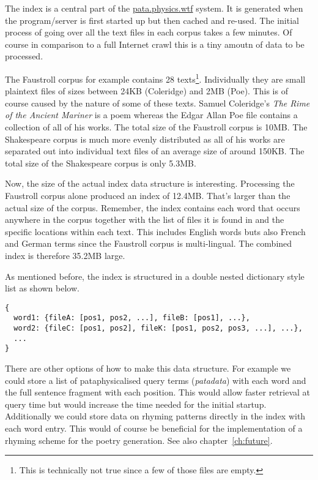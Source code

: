 
The index is a central part of the \url{pata.physics.wtf} system. It is generated when the program/server is first started up but then cached and re-used. The initial process of going over all the text files in each corpus takes a few minutes. Of course in comparison to a full Internet crawl this is a tiny amoutn of data to be processed. 

The Faustroll corpus for example contains 28 texts\footnote{This is technically not true since a few of those files are empty.}. Individually they are small plaintext files of sizes between 24KB (Coleridge) and 2MB (Poe). This is of course caused by the nature of some of these texts. Samuel Coleridge's \textit{The Rime of the Ancient Mariner} is a poem whereas the Edgar Allan Poe file contains a collection of all of his works. The total size of the Faustroll corpus is 10MB. The Shakespeare corpus is much more evenly distributed as all of his works are separated out into individual text files of an average size of around 150KB. The total size of the Shakespeare corpus is only 5.3MB.

Now, the size of the actual index data structure is interesting. Processing the Faustroll corpus alone produced an index of 12.4MB. That's larger than the actual size of the corpus. Remember, the index contains each word that occurs anywhere in the corpus together with the list of files it is found in and the specific locations within each text. This includes English words buts also French and German terms since the Faustroll corpus is multi-lingual. The combined index is therefore 35.2MB large.

\spirals

As mentioned before, the index is structured in a double nested dictionary style list as shown below.

\begin{verbatim}
{
  word1: {fileA: [pos1, pos2, ...], fileB: [pos1], ...},
  word2: {fileC: [pos1, pos2], fileK: [pos1, pos2, pos3, ...], ...},
  ...
}
\end{verbatim}

There are other options of how to make this data structure. For example we could store a list of pataphysicalised query terms (\emph{patadata}) with each word and the full sentence fragment with each position. This would allow faster retrieval at query time but would increase the time needed for the initial startup. Additionally we could store data on rhyming patterns directly in the index with each word entry. This would of course be beneficial for the implementation of a rhyming scheme for the poetry generation. See also chapter~\ref{ch:future}.

